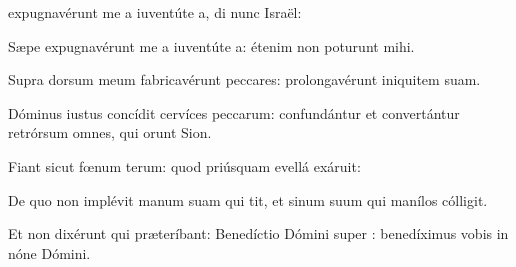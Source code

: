 \item {} expugnavérunt me a iuventúte a,\psstar{} di nunc Israël:

\item Sæpe expugnavérunt me a iuventúte a:\psstar{} étenim non poturunt mihi.

\item Supra dorsum meum fabricavérunt peccares:\psstar{} prolongavérunt iniquitem suam.

\item Dóminus iustus concídit cervíces peccarum:\psstar{} confundántur et convertántur retrórsum omnes, qui orunt Sion.

\item Fiant sicut fœnum terum:\psstar{} quod priúsquam evellá exáruit:

\item De quo non implévit manum suam qui tit,\psstar{} et sinum suum qui manílos cólligit.

\item Et non dixérunt qui præteríbant: Benedíctio Dómini super :\psstar{} benedíximus vobis in nóne Dómini.
